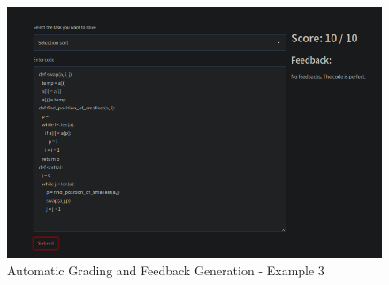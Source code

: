 \begin{figure}[h!]
\centering
\includegraphics[scale=0.6]{./figures/dep5.png}
\caption{Automatic Grading and Feedback Generation - Example 3}
\label{fig5}
\end{figure}


